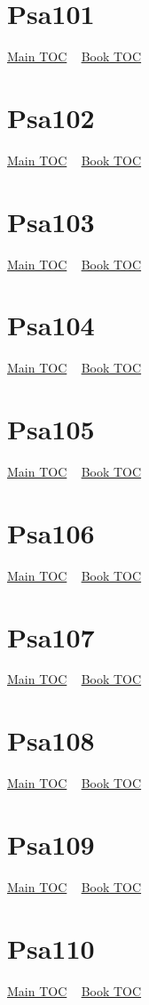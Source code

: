 \documentclass{book}
\begin{document}
  \section{Psa101}\hyperlink{toc}{Main TOC} ~ \hyperref[subsec:Psa]{Book TOC} 
  \section{Psa102}\hyperlink{toc}{Main TOC} ~ \hyperref[subsec:Psa]{Book TOC} 
  \section{Psa103}\hyperlink{toc}{Main TOC} ~ \hyperref[subsec:Psa]{Book TOC} 
  \section{Psa104}\hyperlink{toc}{Main TOC} ~ \hyperref[subsec:Psa]{Book TOC} 
  \section{Psa105}\hyperlink{toc}{Main TOC} ~ \hyperref[subsec:Psa]{Book TOC} 
  \section{Psa106}\hyperlink{toc}{Main TOC} ~ \hyperref[subsec:Psa]{Book TOC} 
  \section{Psa107}\hyperlink{toc}{Main TOC} ~ \hyperref[subsec:Psa]{Book TOC} 
  \section{Psa108}\hyperlink{toc}{Main TOC} ~ \hyperref[subsec:Psa]{Book TOC} 
  \section{Psa109}\hyperlink{toc}{Main TOC} ~ \hyperref[subsec:Psa]{Book TOC} 
  \section{Psa110}\hyperlink{toc}{Main TOC} ~ \hyperref[subsec:Psa]{Book TOC} 
\end{document}

